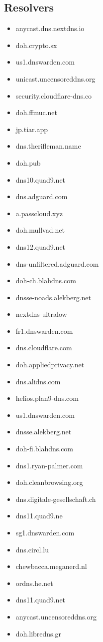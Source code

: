 \subsection{Resolvers}\label{sec:resolvers}
\begin{itemize}
\item anycast.dns.nextdns.io
\item doh.crypto.sx
\item us1.dnswarden.com
\item unicast.uncensoreddns.org
\item security.cloudflare-dns.co
\item doh.ffmuc.net
\item jp.tiar.app
\item dns.therifleman.name
\item doh.pub
\item dns10.quad9.net
\item dns.adguard.com
\item a.passcloud.xyz
\item doh.mullvad.net
\item dns12.quad9.net
\item dns-unfiltered.adguard.com
\item doh-ch.blahdns.com
\item dnsse-noads.alekberg.net
\item nextdns-ultralow
\item fr1.dnswarden.com
\item dns.cloudflare.com
\item doh.appliedprivacy.net
\item dns.alidns.com
\item helios.plan9-dns.com
\item us1.dnswarden.com
\item dnsse.alekberg.net
\item doh-fi.blahdns.com
\item dns1.ryan-palmer.com
\item doh.cleanbrowsing.org
\item dns.digitale-gesellschaft.ch
\item dns11.quad9.ne
\item sg1.dnswarden.com
\item dns.circl.lu
\item chewbacca.meganerd.nl
\item ordns.he.net
\item dns11.quad9.net
\item anycast.uncensoreddns.org
\item doh.libredns.gr

\end{itemize}
